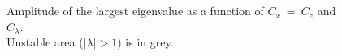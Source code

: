 \documentclass[a4paper]{article}
\numberwithin{equation}{section}
\begin{document}
\begin{figure}[!ht]
   \centering
   \quad
   \\
   \quad
   \\
   \caption {Amplitude of the largest eigenvalue as a function of $C_x\ =\ C_z$ and $C_\lambda$.\\
   Unstable area ($\mid\lambda\mid >1$) is in grey. }
   \label{Figstabcs}
\end{figure}
\end{document}
